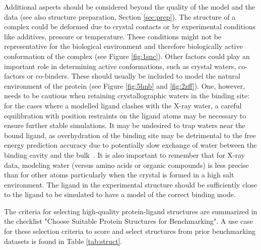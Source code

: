 \documentclass[9pt,bestpractices,pubversion]{livecoms}
\begin{document}
Additional aspects should be considered beyond the quality of the model and the data (see also structure preparation, Section \ref{sec:prep}).
%
The structure of a complex could be deformed due to crystal contacts
or by experimental conditions like additives, pressure or temperature. These conditions might not be representative for the biological environment and therefore biologically active conformation of the complex (see Figure \ref{fig:1snc}). 
%
Other factors could play an important role in determining  active conformations, such as crystal waters, co-factors or co-binders. These should usually be included to model the natural environment of the protein (see Figure \ref{fig:5hnb} and \ref{fig:2zff}). One, however, needs to be cautious when retaining crystallographic waters in the binding site: for the cases where a modelled ligand clashes with the X-ray water, a careful equilibration with position restraints on the ligand atoms may be necessary to ensure further stable simulations. It may be undesired to trap waters near the bound ligand, as overhydration of the binding site may be detrimental to the free energy prediction accuracy due to potentially slow exchange of water between the binding cavity and the bulk~\cite{khalak2021absolutedg}. It is also important to remember that for X-ray data, modeling water (versus amino acids or organic compounds) is less precise than for other atoms particularly when the crystal is formed in a high salt environment.
%
The ligand in the experimental structure should be sufficiently close to the ligand to be simulated to have a model of the correct binding mode.

The criteria for selecting high-quality protein-ligand structures are summarized in the checklist "Choose Suitable Protein Structures for Benchmarking". A use case for these selection criteria to score and select structures from prior benchmarking datasets is found in Table \ref{tab:struct}.
\end{document}
